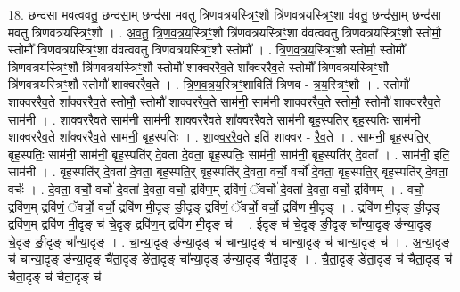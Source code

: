 \documentclass[17pt]{extarticle}
\begin{document}
18. छन्द॑सा मवत्ववतु॒ छन्द॑सा॒म् छन्द॑सा मवतु त्रिणवत्रयस्त्रिꣳ॒॒शौ त्रि॑णवत्रयस्त्रिꣳ॒॒शा व॑वतु॒ छन्द॑सा॒म् छन्द॑सा मवतु त्रिणवत्रयस्त्रिꣳ॒॒शौ । . अ॒व॒तु॒ त्रि॒ण॒व॒त्र॒य॒स्त्रिꣳ॒॒शौ त्रि॑णवत्रयस्त्रिꣳ॒॒शा व॑वत्ववतु त्रिणवत्रयस्त्रिꣳ॒॒शौ स्तोमौ॒ स्तोमौ᳚ त्रिणवत्रयस्त्रिꣳ॒॒शा व॑वत्ववतु त्रिणवत्रयस्त्रिꣳ॒॒शौ स्तोमौ᳚ । . त्रि॒ण॒व॒त्र॒य॒स्त्रिꣳ॒॒शौ स्तोमौ॒ स्तोमौ᳚ त्रिणवत्रयस्त्रिꣳ॒॒शौ त्रि॑णवत्रयस्त्रिꣳ॒॒शौ स्तोमौ॑ शाक्वररैव॒ते शा᳚क्वररैव॒ते स्तोमौ᳚ त्रिणवत्रयस्त्रिꣳ॒॒शौ त्रि॑णवत्रयस्त्रिꣳ॒॒शौ स्तोमौ॑ शाक्वररैव॒ते । . त्रि॒ण॒व॒त्र॒य॒स्त्रिꣳ॒॒शाविति॑ त्रिणव - त्र॒य॒स्त्रिꣳ॒॒शौ । . स्तोमौ॑ शाक्वररैव॒ते शा᳚क्वररैव॒ते स्तोमौ॒ स्तोमौ॑ शाक्वररैव॒ते साम॑नी॒ साम॑नी शाक्वररैव॒ते स्तोमौ॒ स्तोमौ॑ शाक्वररैव॒ते साम॑नी । . शा॒क्व॒र॒रै॒व॒ते साम॑नी॒ साम॑नी शाक्वररैव॒ते शा᳚क्वररैव॒ते साम॑नी॒ बृह॒स्पति॒र् बृह॒स्पतिः॒ साम॑नी शाक्वररैव॒ते शा᳚क्वररैव॒ते साम॑नी॒ बृह॒स्पतिः॑ । . शा॒क्व॒र॒रै॒व॒ते इति॑ शाक्वर - रै॒व॒ते । . साम॑नी॒ बृह॒स्पति॒र् बृह॒स्पतिः॒ साम॑नी॒ साम॑नी॒ बृह॒स्पति॑र् दे॒वता॑ दे॒वता॒ बृह॒स्पतिः॒ साम॑नी॒ साम॑नी॒ बृह॒स्पति॑र् दे॒वता᳚ । . साम॑नी॒ इति॒ साम॑नी । . बृह॒स्पति॑र् दे॒वता॑ दे॒वता॒ बृह॒स्पति॒र् बृह॒स्पति॑र् दे॒वता॒ वर्चो॒ वर्चो॑ दे॒वता॒ बृह॒स्पति॒र् बृह॒स्पति॑र् दे॒वता॒ वर्चः॑ । . दे॒वता॒ वर्चो॒ वर्चो॑ दे॒वता॑ दे॒वता॒ वर्चो॒ द्रवि॑ण॒म् द्रवि॑णं॒ ॅवर्चो॑ दे॒वता॑ दे॒वता॒ वर्चो॒ द्रवि॑णम् । . वर्चो॒ द्रवि॑ण॒म् द्रवि॑णं॒ ॅवर्चो॒ वर्चो॒ द्रवि॑ण मी॒दृङ् ङी॒दृङ् द्रवि॑णं॒ ॅवर्चो॒ वर्चो॒ द्रवि॑ण मी॒दृङ् । . द्रवि॑ण मी॒दृङ् ङी॒दृङ् द्रवि॑ण॒म् द्रवि॑ण मी॒दृङ् च॑ चे॒दृङ् द्रवि॑ण॒म् द्रवि॑ण मी॒दृङ् च॑ । . ई॒दृङ् च॑ चे॒दृङ् ङी॒दृङ् चा᳚न्या॒दृङ् ङ॑न्या॒दृङ् चे॒दृङ् ङी॒दृङ् चा᳚न्या॒दृङ् । . चा॒न्या॒दृङ् ङ॑न्या॒दृङ् च॑ चान्या॒दृङ् च॑ चान्या॒दृङ् च॑ चान्या॒दृङ् च॑ । . अ॒न्या॒दृङ् च॑ चान्या॒दृङ् ङ॑न्या॒दृङ् चै॑ता॒दृङ् ङे॑ता॒दृङ् चा᳚न्या॒दृङ् ङ॑न्या॒दृङ् चै॑ता॒दृङ् । . चै॒ता॒दृङ् ङे॑ता॒दृङ् च॑ चैता॒दृङ् च॑ चैता॒दृङ् च॑ चैता॒दृङ् च॑ । \newline
\end{document}
